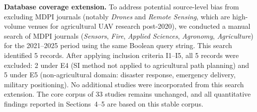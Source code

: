 \documentclass[review,3p,times]{elsarticle}
\begin{document}
\textbf{Database coverage extension.} To address potential source-level bias from excluding MDPI journals (notably \textit{Drones} and \textit{Remote Sensing}, which are high-volume venues for agricultural UAV research post-2020), we conducted a manual search of MDPI journals (\textit{Sensors}, \textit{Fire}, \textit{Applied Sciences}, \textit{Agronomy}, \textit{Agriculture}) for the 2021--2025 period using the same Boolean query string. This search identified 5 records. After applying inclusion criteria I1--I5, all 5 records were excluded: 2 under E4 (SI method not applied to agricultural path planning) and 5 under E5 (non-agricultural domain: disaster response, emergency delivery, military positioning). No additional studies were incorporated from this search extension. The core corpus of 33 studies remains unchanged, and all quantitative findings reported in Sections~4--5 are based on this stable corpus.
\end{document}
